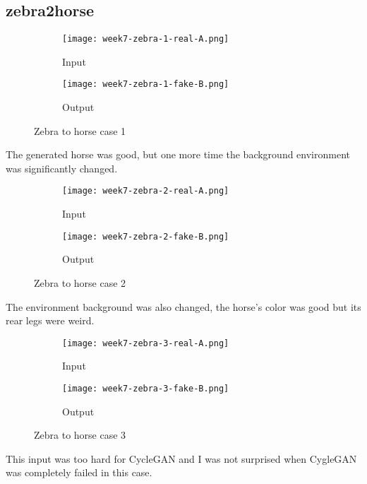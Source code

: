 \subsection{zebra2horse}
\begin{figure}[!ht]
\centering
\begin{subfigure}{0.5\textwidth}
  \centering
  \texttt{[image: week7-zebra-1-real-A.png]}
  \caption{Input}
\end{subfigure}%
\begin{subfigure}{0.5\textwidth}
  \centering
  \texttt{[image: week7-zebra-1-fake-B.png]}
  \caption{Output}
\end{subfigure}
\caption{Zebra to horse case 1}
\end{figure}
The generated horse was good, but one more time the background environment was significantly changed.

\newpage
\begin{figure}[!ht]
\centering
\begin{subfigure}{0.5\textwidth}
  \centering
  \texttt{[image: week7-zebra-2-real-A.png]}
  \caption{Input}
\end{subfigure}%
\begin{subfigure}{0.5\textwidth}
  \centering
  \texttt{[image: week7-zebra-2-fake-B.png]}
  \caption{Output}
\end{subfigure}
\caption{Zebra to horse case 2}
\end{figure}
The environment background was also changed, the horse's color was good but its rear legs were weird.

\begin{figure}[!ht]
\centering
\begin{subfigure}{0.5\textwidth}
  \centering
  \texttt{[image: week7-zebra-3-real-A.png]}
  \caption{Input}
\end{subfigure}%
\begin{subfigure}{0.5\textwidth}
  \centering
  \texttt{[image: week7-zebra-3-fake-B.png]}
  \caption{Output}
\end{subfigure}
\caption{Zebra to horse case 3}
\end{figure}
This input was too hard for CycleGAN and I was not surprised when CygleGAN was completely failed in this case.

